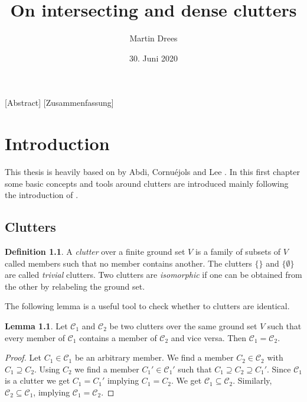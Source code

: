 \documentclass[a4paper, 12pt]{scrbook}
\author{Martin Drees}
\date{30. Juni 2020}
\title{On intersecting and dense clutters}
\theoremstyle{definition}
\newtheorem*{definition}{Definition}
\newtheorem{lemma}[theorem]{Lemma}
\begin{document}
\maketitle
{}
[Abstract]
{\let\cleardoublepage\relax {}}
[Zusammenfassung]

   \tableofcontents
   \chapter{Introduction}
   This thesis is heavily based on  by Abdi, Cornuéjols and Lee \cite{restrictions}.
   In this first chapter some basic concepts and tools around clutters are introduced mainly following the introduction of \cite{restrictions}.
   \section{Clutters}
   \begin{definition}
       A \emph{clutter} over a finite ground set $V$ is a family of subsets of $V$ called members such that no member contains another.
       The clutters $\{\}$ and $\{\emptyset\}$ are called \emph{trivial} clutters.
       Two clutters are \emph{isomorphic} if one can be obtained from the other by relabeling the ground set.
   \end{definition}
   The following lemma is a useful tool to check whether to clutters are identical.
   \begin{lemma}\label{equalclutters}
       Let $\mathcal{C}_1$ and $\mathcal{C}_2$ be two clutters over the same ground set $V$ such that every member of $\mathcal{C}_1$ contains a member of $\mathcal{C}_2$ and vice versa.
       Then $\mathcal{C}_1=\mathcal{C}_2$.
   \end{lemma}

   \begin{proof}
       Let $C_1 \in \mathcal{C}_1$ be an arbitrary member.
       We find a member $C_2 \in \mathcal{C}_2$ with $C_1 \supseteq C_2$.
       Using $C_2$ we find a member $C_1' \in \mathcal{C}_1'$ such that $C_1 \supseteq C_2 \supseteq C_1'$.
       Since $\mathcal{C}_1$ is a clutter we get $C_1=C_1'$ implying $C_1=C_2$.
       We get $\mathcal{C}_1 \subseteq \mathcal{C}_2$.
       Similarly, $\mathcal{C}_2 \subseteq \mathcal{C}_1$, implying $\mathcal{C}_1=\mathcal{C}_2$.
   \end{proof}
\end{document}
